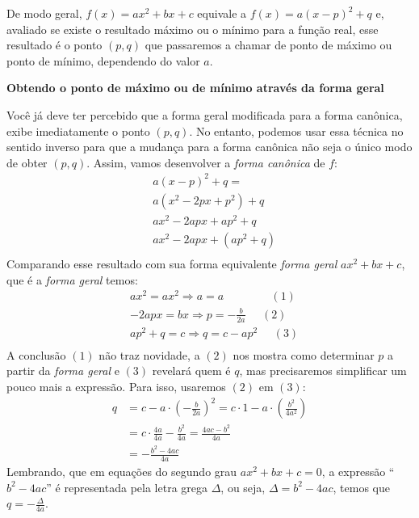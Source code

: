 De modo geral, \(f(x)=ax^{2}+bx+c\) equivale a \(f(x)=a(x-p)^{2}+q\) e, avaliado se existe o resultado máximo ou o mínimo para a função real, esse resultado é o ponto \((p,q)\) que passaremos a chamar de ponto de máximo ou ponto de mínimo, dependendo do valor \(a\).

\textbf{Obtendo o ponto de máximo ou de mínimo através da forma geral}

Você já deve ter percebido que a forma geral modificada para a forma canônica, exibe imediatamente o ponto \((p,q)\). No entanto, podemos usar essa técnica no sentido inverso para que a mudança para a forma canônica não seja o único modo de obter \((p,q)\). Assim, vamos desenvolver a \emph{forma canônica} de \(f\):
\begin{equation*}
\begin{split}& a(x-p)^2+q= \\
& a(x^2-2px+p^2)+q \\
& ax^2-2apx+ap^2+q \\
& ax^2-2apx+(ap^2+q) \\\end{split}
\end{equation*}
Comparando esse resultado com sua forma equivalente \emph{forma geral} \(ax^2+bx+c\), que é a \emph{forma geral} temos:
\begin{equation*}
\begin{split}& ax^2=ax^2 \Rightarrow a=a \;\;\;\;\;\;\;\;\;\;\;\;\;\;\; (1) \\
& -2apx=bx \Rightarrow p=-\frac{b}{2a} \;\;\;\;\; (2)\\
& ap^2+q=c \Rightarrow q=c-ap^2 \;\;\;\;\; (3)\\\end{split}
\end{equation*}
A conclusão \((1)\) não traz novidade, a \((2)\) nos mostra como determinar \(p\) a partir da \emph{forma geral} e \((3)\) revelará quem é \(q\), mas precisaremos simplificar um pouco mais a expressão. Para isso, usaremos \((2)\) em \((3)\):
\begin{equation*}
\begin{split}q &=c-a \cdot \left(- \frac{b}{2a} \right)^{2} =c \cdot 1-a \cdot \left( \frac{b^2}{4a^2} \right) \\
& =c \cdot \frac{4a}{4a} - \frac{b^2}{4a}= \frac{4ac-b^2}{4a} \\
& = - \frac{b^2-4ac}{4a}\end{split}
\end{equation*}
Lembrando, que em equações do segundo grau \(ax^2+bx+c=0\), a expressão “\(b^2-4ac\)” é representada pela letra grega \(\Delta\), ou seja, \(\Delta = b^2-4ac\), temos que \(q = - \displaystyle\frac{\Delta}{4a}\).

